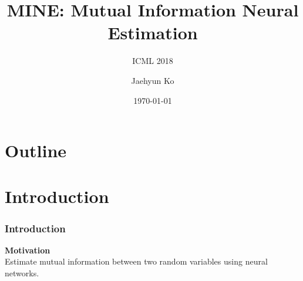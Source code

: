 \documentclass[aspectratio=169]{beamer}
\begin{document}


\begin{frame}
	\title{MINE: Mutual Information Neural Estimation}
	\subtitle{ICML 2018}
	\author{Jaehyun Ko}
	\date{\today}
	\titlepage
\end{frame}


\section*{Outline}
\begin{frame}
\tableofcontents
\end{frame}



\section{Introduction}
\begin{frame}
	\frametitle{Introduction}
	\textbf{Motivation} \\ Estimate mutual information between two random variables using neural networks. \\
\end{frame}

\end{document}
